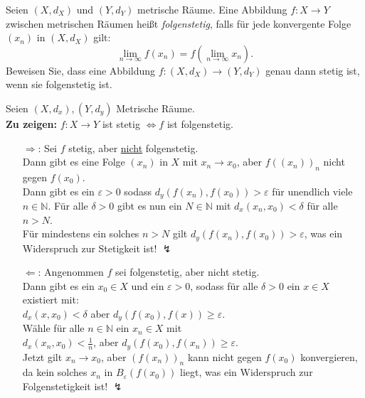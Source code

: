 \newpage
\begin{assignment}
  Seien \( (X,d_X) \) und \( (Y, d_Y) \) metrische Räume. Eine Abbildung \( f: X \to Y \) zwischen metrischen Räumen heißt \emph{folgenstetig}, falls für jede konvergente Folge \( (x_n) \) in \( (X, d_X) \) gilt:
  \begin{equation*}
    \lim_{n \to \infty} f(x_n) = f\left( \lim_{n \to \infty} x_n \right)\text{.}
  \end{equation*}
  Beweisen Sie, dass eine Abbildung \( f: (X, d_X) \to (Y, d_Y) \) genau dann stetig ist, wenn sie folgenstetig ist.
\end{assignment}
\begin{solution}
  Seien \( (X,d_x), (Y,d_y) \) Metrische Räume. \\
  \textbf{Zu zeigen:} \( f: X \to Y \) ist stetig \( \Leftrightarrow f \) ist folgenstetig.
  \begin{itemize}
    \item[\( \Rightarrow \):] Sei \( f \) stetig, aber \underline{nicht} folgenstetig. \\
    Dann gibt es eine Folge \( (x_n) \) in \( X \) mit \( x_n \to x_0 \), aber \( {f((x_n))}_n \) nicht gegen \( f(x_0) \). \\
    Dann gibt es ein \( \varepsilon > 0 \) sodass \( d_y(f(x_n),f(x_0)) > \varepsilon \) für unendlich viele \( n \in \mathbb{N} \). Für alle \( \delta > 0 \) gibt es nun ein \( N \in \mathbb{N} \) mit \( d_x(x_n,x_0) < \delta \) für alle \( n > N \). \\
    Für mindestens ein solches \( n > N \) gilt \( d_y(f(x_n),f(x_0)) > \varepsilon \), was ein Widerspruch zur Stetigkeit ist! \( \lightning \) 
    
    \item[\( \Leftarrow \):] Angenommen \( f \) sei folgenstetig, aber nicht stetig. \\
    Dann gibt es ein \( x_0 \in X \) und ein \( \varepsilon > 0 \), sodass für alle \( \delta > 0 \) ein \( x \in X \) existiert mit: \\
    \( d_x(x,x_0) < \delta \) aber \( d_y(f(x_0),f(x)) \geq \varepsilon \). \\
    Wähle für alle \( n \in \mathbb{N} \) ein \( x_n \in X \) mit\\
    \( d_x(x_n,x_0) < \frac{1}{n} \), aber \( d_y(f(x_0), f(x_n)) \geq \varepsilon \). \\
    Jetzt gilt \( x_n \to x_0 \), aber \( {(f(x_n))}_n \) kann nicht gegen \( f(x_0) \) konvergieren, da kein solches \( x_n \) in \( B_{\varepsilon}(f(x_0)) \) liegt, was ein Widerspruch zur Folgenstetigkeit ist! \( \lightning \) 
  \end{itemize}
\end{solution}



